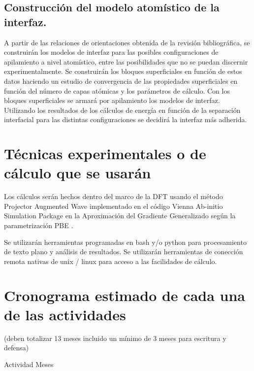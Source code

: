 \subsection{ Construcción del modelo atomístico de la interfaz.}

A partir de las relaciones de orientaciones obtenida de la revisión 
bibliográfica, se construirán los modelos de interfaz para las posibles 
configuraciones de apilamiento a nivel atomístico, entre las posibilidades que 
no se puedan discernir experimentalmente. Se construirán los bloques 
superficiales en función de estos datos haciendo un estudio de convergencia de 
las propiedades superficiales en función del número de capas atómicas y los 
parámetros de cálculo. Con los bloques superficiales se armará por apilamiento 
los modelos de interfaz. Utilizando los resultados de los cálculos de energía 
en función de la separación interfacial para las distintas configuraciones 
\cite{Jiangetal} 
se decidirá la interfaz más adherida.

\section{Técnicas experimentales o de cálculo que se usarán}

Los cálculos serán hechos dentro del marco de la DFT \cite{KohnSham65,
HohenbergKohn64} usando el método 
Projector Augmented Wave\cite{Bloch1994,Kresse1999}
implementado en el código Vienna Ab-initio 
Simulation Package\cite{Hafner2007,Hafner2008}
en la Aproximación del Gradiente Generalizado según la 
parametrización PBE \cite{PBE}. 

Se utilizarán herramientas programadas en bash y/o python para procesamiento de 
texto plano y análisis de resultados. Se utilizarán herramientas de conección 
remota nativas de unix / linux para acceso a las facilidades de cálculo.

\section{Cronograma estimado de cada una de las actividades}

 (deben totalizar 13 
meses incluido un mínimo de 3 meses para escritura y defensa) 


Actividad
Meses

